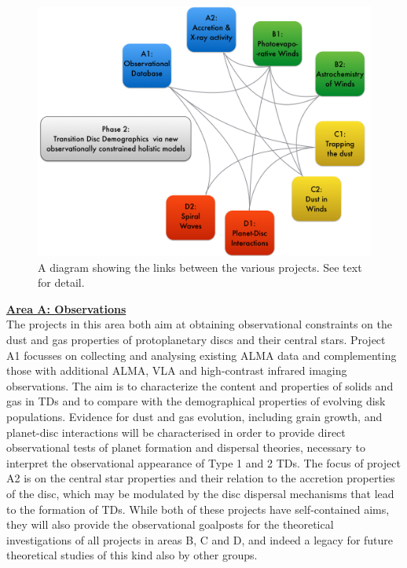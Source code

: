 \documentclass[10pt,fleqn,twoside]{article}
\newcommand{\AreacolA}{\color{blue}}
\begin{document}
\begin{figure}
\centerline{\includegraphics[width=13cm]{figures/dependency2.jpg}}
\caption{A diagram showing the links between the various
projects. See text for detail.}

\end{figure}

\vspace{1.0em}


%
\noindent\underline{{\bf\AreacolA Area A: Observations}}\\
\noindent The projects in this area both aim at obtaining
observational constraints on the dust and gas properties of
protoplanetary discs and their central stars. Project A1 focusses on
collecting and analysing existing ALMA data and complementing those
with additional ALMA, VLA and high-contrast infrared imaging observations. 
The aim is to characterize the content and properties of solids and gas in TDs 
and to compare with the demographical properties of evolving disk populations. 
Evidence for dust and gas evolution, including grain growth,
and planet-disc interactions will be characterised in order to provide
direct observational tests of planet formation and dispersal theories,
necessary to interpret the observational appearance of Type 1 and 2
TDs. The focus of project A2 is on the central star properties and
their relation to the accretion properties of the disc, which may be
modulated by the disc dispersal mechanisms that lead to the formation
of TDs. While both of these projects have self-contained aims, they
will also provide the observational goalposts for the theoretical
investigations of all projects in areas B, C and D, and indeed a
legacy for future theoretical studies of this kind also by other
groups.  
\end{document}
